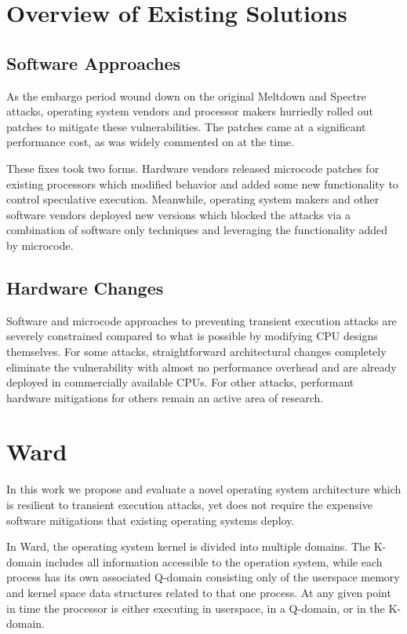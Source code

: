 \section*{Overview of Existing Solutions}
\subsection*{Software Approaches}
As the embargo period wound down on the original Meltdown and Spectre attacks, operating system vendors and processor makers hurriedly rolled out patches to mitigate these vulnerabilities.
The patches came at a significant performance cost, as was widely commented on at the time. 

These fixes took two forms.
Hardware vendors released microcode patches for existing processors which modified behavior and added some new functionality to control speculative execution.
Meanwhile, operating system makers and other software vendors deployed new versions which blocked the attacks via a combination of software only techniques and leveraging the functionality added by microcode.

\subsection*{Hardware Changes}
Software and microcode approaches to preventing transient execution attacks are severely constrained compared to what is possible by modifying CPU designs themselves.
For some attacks, straightforward architectural changes completely eliminate the vulnerability with almost no performance overhead and are already deployed in commercially available CPUs.
For other attacks, performant hardware mitigations for others remain an active area of research.

\section*{Ward}
In this work we propose and evaluate a novel operating system architecture which is resilient to transient execution attacks, yet does not require the expensive software mitigations that existing operating systems deploy. 

In Ward, the operating system kernel is divided into multiple domains.
The K-domain includes all information accessible to the operation system, while each process has its own associated Q-domain consisting only of the userspace memory and kernel space data structures related to that one process.
At any given point in time the processor is either executing in userspace, in a Q-domain, or in the K-domain. 

